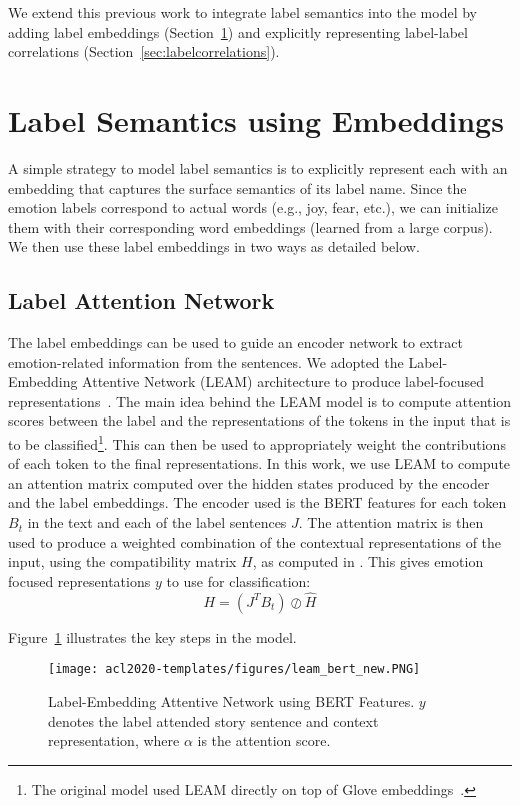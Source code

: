 \documentclass[11pt,a4paper]{article}
\begin{document}
We extend this previous work to integrate label semantics into the model by adding label embeddings (Section~\ref{sec:labelembeddings}) and explicitly representing label-label correlations (Section~\ref{sec:labelcorrelations}).


\section{Label Semantics using Embeddings}
\label{sec:labelembeddings}

A simple strategy to model label semantics is to explicitly represent each with an embedding that captures the surface semantics of its label name. Since the emotion labels correspond to actual words (e.g., joy, fear, etc.), we can initialize them with their corresponding word embeddings (learned from a large corpus). We then use these label embeddings in two ways as detailed below.

\subsection{Label Attention Network}
The label embeddings can be used to guide an encoder network to extract emotion-related information from the sentences. We adopted the Label-Embedding Attentive Network (LEAM) architecture to produce label-focused representations~\cite{wang2018joint}. The main idea behind the LEAM model is to compute attention scores between the label and the representations of the tokens in the input that is to be classified\footnote{The original model used LEAM directly on top of Glove embeddings~\cite{wang2018joint}.}. This can then be used to appropriately weight the contributions of each token to the final representations. In this work, we use LEAM to compute an attention matrix computed over the hidden states produced by the encoder and the label embeddings. The encoder used is the BERT features for each token $B_{t}$ in the text and each of the label sentences $J$. The attention matrix is then used to produce a weighted combination of the contextual representations of the input, using the compatibility matrix $H$, as computed in \cite{wang2018joint}. This gives emotion focused representations $y$ to use for classification: 
\begin{equation}
    H = (J^{T}B_{t})\oslash \hat{H}
\end{equation}

Figure~\ref{fig:leam_bert} illustrates the key steps in the model.
  \begin{figure}
    
    \texttt{[image: acl2020-templates/figures/leam\_bert\_new.PNG]}
    \caption{Label-Embedding Attentive Network using BERT Features. $y$ denotes the label attended story sentence and context representation, where $\alpha$ is the attention score.
    }\label{fig:leam_bert}
  \end{figure}
  
\end{document}
